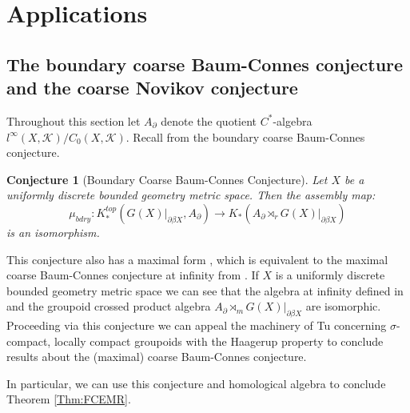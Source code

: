 \documentclass[preprint]{elsarticle}
\theoremstyle{plain}
\newtheorem*{conjecture1}{Conjecture}
\theoremstyle{definition}%
\theoremstyle{remark}%
\begin{document}
\section{Applications}\label{sect:apps}

\subsection{The boundary coarse Baum-Connes conjecture and the coarse Novikov conjecture}\label{Sect:apps}
Throughout this section let $A_{\partial}$ denote the quotient $C^{*}$-algebra $l^{\infty}(X,\mathcal{K})/C_{0}(X,\mathcal{K})$. Recall from \cite{mypub1} the boundary coarse Baum-Connes conjecture.
\begin{conjecture1} [Boundary Coarse Baum-Connes Conjecture]
Let $X$ be a uniformly discrete bounded geometry metric space. Then the assembly map:
\begin{equation*}
\mu_{bdry}:K_{*}^{top}(G(X)|_{\partial\beta X}, A_{\partial}) \rightarrow K_{*}(A_{\partial}\rtimes_{r}G(X)|_{\partial\beta X})
\end{equation*}
is an isomorphism.
\end{conjecture1}

This conjecture also has a maximal form \cite[Section 4]{mypub1}, which is equivalent to the maximal coarse Baum-Connes conjecture at infinity from \cite{FCEpaper}. If $X$ is a uniformly discrete bounded geometry metric space we can see that the algebra at infinity defined in \cite{FCEpaper} and the groupoid crossed product algebra $A_{\partial}\rtimes_{m}G(X)|_{\partial\beta X}$ are isomorphic. Proceeding via this conjecture we can appeal the machinery of Tu \cite{MR1703305} concerning $\sigma$-compact, locally compact groupoids with the Haagerup property to conclude results about the (maximal) coarse Baum-Connes conjecture. 

In particular, we can use this conjecture and homological algebra to conclude Theorem \ref{Thm:FCEMR}.
\end{document}
